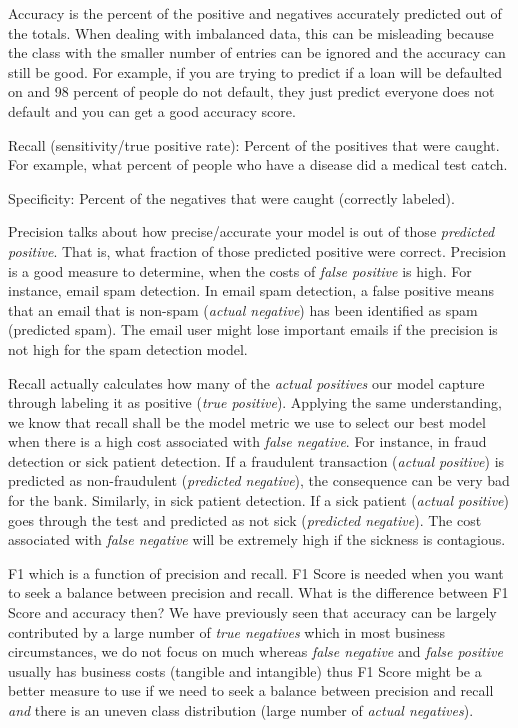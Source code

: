 Accuracy is the percent of the positive and negatives accurately predicted out of the totals.  When dealing with imbalanced data, this can be misleading because the class with the smaller number of entries can be ignored and the accuracy can still be good.  For example, if you are trying to predict if a loan will be defaulted on and 98 percent of people do not default, they just predict everyone does not default and you can get a good accuracy score.

Recall (sensitivity/true positive rate): Percent of the positives that were caught.  For example, what percent of people who have a disease did a medical test catch.

Specificity: Percent of the negatives that were caught (correctly labeled).

Precision talks about how precise/accurate your model is out of those \emph{predicted positive}.  That is, what fraction of those predicted positive were correct.  Precision is a good measure to determine, when the costs of \emph{false positive} is high. For instance, email spam detection. In email spam detection, a false positive means that an email that is non-spam (\emph{actual negative}) has been identified as spam (predicted spam). The email user might lose important emails if the precision is not high for the spam detection model.

Recall actually calculates how many of the \emph{actual positives} our model capture through labeling it as positive (\emph{true positive}). Applying the same understanding, we know that recall shall be the model metric we use to select our best model when there is a high cost associated with \emph{false negative}.  For instance, in fraud detection or sick patient detection. If a fraudulent transaction (\emph{actual positive}) is predicted as non-fraudulent (\emph{predicted negative}), the consequence can be very bad for the bank.  Similarly, in sick patient detection. If a sick patient (\emph{actual positive}) goes through the test and predicted as not sick (\emph{predicted negative}). The cost associated with \emph{false negative} will be extremely high if the sickness is contagious.

F1 which is a function of precision and recall.  F1 Score is needed when you want to seek a balance between precision and recall. What is the difference between F1 Score and accuracy then?  We have previously seen that accuracy can be largely contributed by a large number of \emph{true negatives} which in most business circumstances, we do not focus on much whereas \emph{false negative} and \emph{false positive} usually has business costs (tangible and intangible) thus F1 Score might be a better measure to use if we need to seek a balance between precision and recall \emph{and} there is an uneven class distribution (large number of \emph{actual negatives}).


